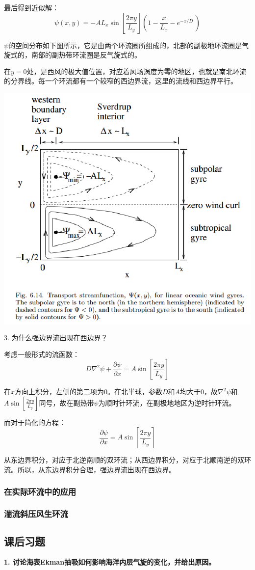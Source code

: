\documentclass{article}
\begin{document}
最后得到近似解：
$$\psi \left( x,y \right)=-A{{L}_{x}}\sin \left[ \frac{2\pi y}{{{L}_{y}}} \right]\left( 1-\frac{x}{{{L}_{x}}}-{{e}^{{-x}/{D}\;}} \right)$$

$\psi$的空间分布如下图所示，它是由两个环流圈所组成的，北部的副极地环流圈是气旋式的，南部的副热带环流圈是反气旋式的。

在$y=0$处，是西风的极大值位置，对应着风场涡度为零的地区，也就是南北环流的分界线。每一个环流都有一个较窄的西边界流，这里的流线和西边界平行。
\begin{center}
    \includegraphics[width=0.5\linewidth]{Fig5_4.png}
\end{center}

3. 为什么强边界流出现在西边界？

考虑一般形式的流函数：
$$D{{\nabla }^{2}}\psi +\frac{\partial \psi }{\partial x}=A\sin [ \frac{2\pi y}{{{L}_{y}}}] $$

在$x$方向上积分，左侧的第二项为$0$。在北半球，参数$D$和$A$均大于$0$，故${\nabla }^{2}\psi$和$A\sin [ \frac{2\pi y}{{{L}_{y}}}]$同号，故在副热带$\psi$为顺时针环流，在副极地地区为逆时针环流。

而对于简化的方程：
$$\frac{\partial \psi }{\partial x}=A\sin \left[ \frac{2\pi y}{{{L}_{y}}} \right]$$

从东边界积分，对应于北逆南顺的双环流；从西边界积分，对应于北顺南逆的双环流。所以，从东边界积分合理，强边界流出现在西边界。

\subsubsection{在实际环流中的应用}
\subsubsection{湍流斜压风生环流}

\subsection{课后习题}
\textbf{1. 讨论海表Ekman抽吸如何影响海洋内层气旋的变化，并给出原因。}
\end{document}
